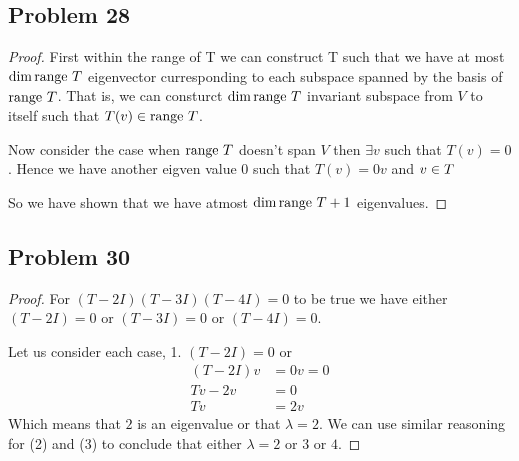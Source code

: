 \documentclass[a4paper]{report}
\begin{document}
 \subsection*{Problem 28}
 \begin{proof}
    First within the range of T we can construct T such that we have at most $\dim \text{range } T$  eigenvector curresponding to each subspace spanned by the basis of $\text{range } T$. That is, we can consturct $\dim \text{range } T$ invariant subspace from $V$ to itself such that $T(v) \in \text{range } T$. 

    Now consider the case when $\text{range } T$ doesn't span $V$ then $\exists v $ such that $T(v) = 0$. Hence we have another eigven value  $0$ such that $T(v) = 0 v$ and  $v \in \null T$

    So we have shown that we have atmost  $\dim \text{range } T + 1$ eigenvalues.
 \end{proof}

\subsection*{Problem 30}
\begin{proof}
   For $(T - 2I)(T - 3I)(T - 4I) = 0$ to be true we have either $(T-2I) = 0$ or $(T-3I) = 0$  or $(T-4I) = 0$.

   Let us consider each case, 
   1. $(T - 2I) = 0$ or  
   \begin{align*}
      (T - 2I)v &= 0v = 0 \\
      Tv - 2v &= 0\\
      Tv &= 2v
   \end{align*}
   Which means that $2$ is an eigenvalue or that $\lambda = 2$. We can use similar reasoning for (2) and (3) to conclude that either  $\lambda =2 $ or $3$ or $4$.
\end{proof}
 
 
\end{document}
